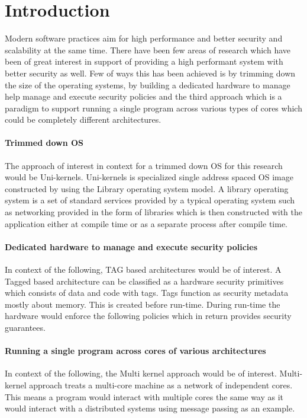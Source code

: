 
\chapter{Introduction}  %
Modern software practices aim for high performance and better security
and scalability at the same time. There have been few areas of research 
which have been of great interest in support 
of providing a high performant system with better security as well.
Few of ways this has been achieved is by trimming down the size of 
the operating systems, by building a dedicated hardware to manage 
help manage and execute security policies and the third approach 
which is a paradigm to support running a single program across 
various types of cores which could be completely different 
architectures.

\subsubsection{Trimmed down OS}
The approach of interest in context for a trimmed down OS for
this research would be Uni-kernels. Uni-kernels is specialized single address 
spaced OS image constructed by using the Library operating 
system model. A library operating system\cite{LibraryOS} is a set of standard services 
provided by a typical operating system such as networking provided 
in the form of libraries which is then constructed with the application 
either at compile time or as a separate process after compile time.

\subsubsection{Dedicated hardware to manage and execute security
policies}
In context of the following, TAG based architectures would be 
of interest. A Tagged based architecture can be classified as 
a hardware security primitives which consists of data and code with tags. 
Tags function as security metadata mostly about memory. This is
created before run-time. During run-time the hardware 
would enforce the following policies which in return 
provides security guarantees. 

\subsubsection{Running a single program across cores of 
various architectures}
In context of the following, the Multi kernel approach would 
be of interest. Multi-kernel approach treats a multi-core machine 
as a network of independent cores. This means a program would interact
with multiple cores the same way as it would interact with a distributed systems 
using message passing as an example. 

